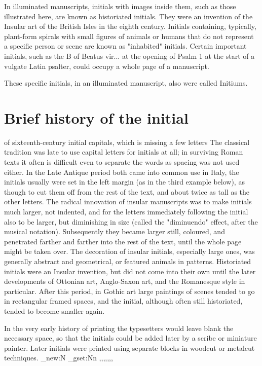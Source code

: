 In illuminated manuscripts, initials with images inside them, such as those illustrated here, are known as historiated initials. They were an invention of the Insular art of the British Isles in the eighth century. Initials containing, typically, plant-form spirals with small figures of animals or humans that do not represent a specific person or scene are known as "inhabited" initials. Certain important initials, such as the B of Beatus vir... at the opening of Psalm 1 at the start of a vulgate Latin psalter, could occupy a whole page of a manuscript.

These specific initials, in an illuminated manuscript, also were called Initiums.

\section{Brief history of the initial}

 of sixteenth-century initial capitals, which is missing a few letters
The classical tradition was late to use capital letters for initials at all; in surviving Roman texts it often is difficult even to separate the words as spacing was not used either. In the Late Antique period both came into common use in Italy, the initials usually were set in the left margin (as in the third example below), as though to cut them off from the rest of the text, and about twice as tall as the other letters. The radical innovation of insular manuscripts was to make initials much larger, not indented, and for the letters immediately following the initial also to be larger, but diminishing in size (called the "diminuendo" effect, after the musical notation). Subsequently they became larger still, coloured, and penetrated farther and farther into the rest of the text, until the whole page might be taken over. The decoration of insular initials, especially large ones, was generally abstract and geometrical, or featured animals in patterns. Historiated initials were an Insular invention, but did not come into their own until the later developments of Ottonian art, Anglo-Saxon art, and the Romanesque style in particular. After this period, in Gothic art large paintings of scenes tended to go in rectangular framed spaces, and the initial, although often still historiated, tended to become smaller again.

In the very early history of printing the typesetters would leave blank the necessary space, so that the initials could be added later by a scribe or miniature painter. Later initials were printed using separate blocks in woodcut or metalcut techniques.
\ExplSyntaxOn
\clist_new:N\dropcapslist
\clist_gset:Nn \dropcapslist
    {
       \Royal,\Romantik,\ArtNouvfamily,\EileenBlfamily,\Zallmanfamily,\Konanurfamily,\Starburstfamily,%
    }
\ExplSyntaxOff

